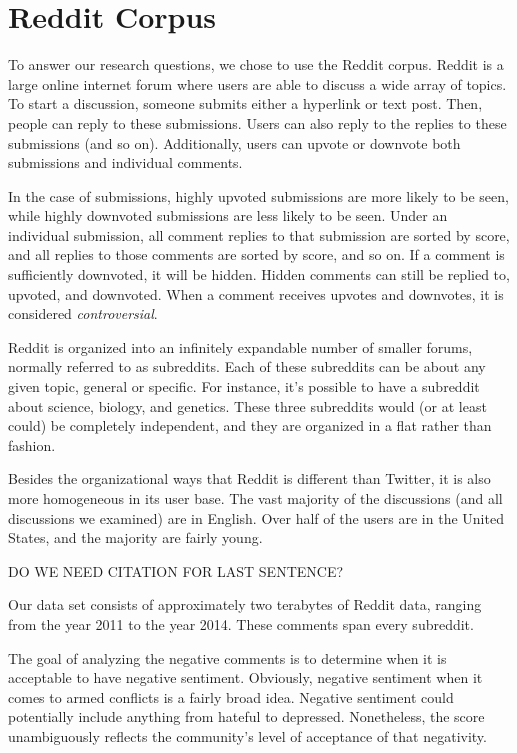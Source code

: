 \section{Reddit Corpus}
To answer our research questions, we chose to use the Reddit corpus. Reddit is a large online internet forum where users are able to discuss a wide array of  topics. To start a discussion, someone submits either a hyperlink or text post. Then, people can reply to these submissions. Users can also reply to the replies to these submissions (and so on). Additionally, users can upvote or downvote both submissions and individual comments. 

In the case of submissions, highly upvoted submissions are more likely to be seen, while highly downvoted submissions are less likely to be seen. Under an individual submission, all comment replies to that submission are sorted by score, and all replies to those comments are sorted by score, and so on. If a comment is sufficiently downvoted, it will be hidden. Hidden comments can still be replied to, upvoted, and downvoted. When a comment receives upvotes and downvotes, it is considered \textit{controversial}.  

Reddit is organized into an infinitely expandable number of smaller forums, normally referred to as subreddits. Each of these subreddits can be about any given topic, general or specific. For instance, it's possible to have a subreddit about science, biology, and genetics. These three subreddits would (or at least could) be completely independent, and they are organized in a flat rather than fashion.

Besides the organizational ways that Reddit is different than Twitter, it is also more homogeneous in its user base. The vast majority of the discussions (and all discussions we examined) are in English. Over half of the users are in the United States, and the majority are fairly young. 

DO WE NEED CITATION FOR LAST SENTENCE?

Our data set consists of approximately two terabytes of Reddit data, ranging from the year 2011 to the year 2014. These comments span every subreddit. 

The goal of analyzing the negative comments is to determine when it is acceptable to have negative sentiment. Obviously, negative sentiment when it comes to armed conflicts is a fairly broad idea. Negative sentiment could potentially include anything from hateful to depressed. Nonetheless, the score unambiguously reflects the community's level of acceptance of that negativity. 

